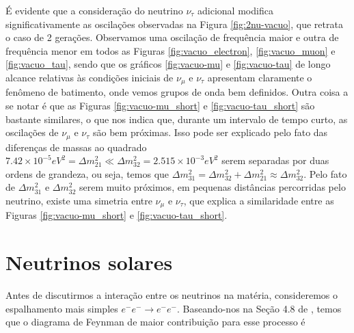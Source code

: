\documentclass[12pt]{report}
\begin{document}
É evidente que a consideração do neutrino $\nu_\tau$ adicional modifica significativamente as oscilações observadas na Figura \ref{fig:2nu-vacuo}, que retrata o caso de 2 gerações. Observamos uma oscilação de frequência maior e outra de frequência menor em todos as Figuras \ref{fig:vacuo_electron}, \ref{fig:vacuo_muon} e \ref{fig:vacuo_tau}, sendo que os gráficos \ref{fig:vacuo-mu} e \ref{fig:vacuo-tau} de longo alcance relativas às condições iniciais de $\nu_\mu$ e $\nu_\tau$ apresentam claramente o fenômeno de batimento, onde vemos grupos de onda bem definidos. Outra coisa a se notar é que as Figuras \ref{fig:vacuo-mu_short} e \ref{fig:vacuo-tau_short} são bastante similares, o que nos indica que, durante um intervalo de tempo curto, as oscilações de $\nu_\mu$ e $\nu_\tau$ são bem próximas. Isso pode ser explicado pelo fato das diferenças de massas ao quadrado $7.42 \times 10^{-5} \unit{eV^2} = \Delta m_{21}^2 \ll \Delta m_{32}^2 = 2.515 \times 10^{-3} \unit{eV^2}$ serem separadas por duas ordens de grandeza, ou seja, temos que $\Delta m_{31}^2 = \Delta m_{32}^2 + \Delta m_{21}^2 \approx \Delta m_{32}^2$. Pelo fato de $\Delta m_{31}^2$ e $\Delta m_{32}^2$ serem muito próximos, em pequenas distâncias percorridas pelo neutrino, existe uma simetria entre $\nu_\mu$ e $\nu_\tau$, que explica a similaridade entre as Figuras \ref{fig:vacuo-mu_short} e \ref{fig:vacuo-tau_short}.

\section{Neutrinos solares} \label{sec:nu-solar}

Antes de discutirmos a interação entre os neutrinos na matéria, consideremos o espalhamento mais simples $e^- e^- \to e^- e^-$. Baseando-nos na Seção 4.8 de \cite{peskin}, temos que o diagrama de Feynman de maior contribuição para esse processo é
\end{document}
